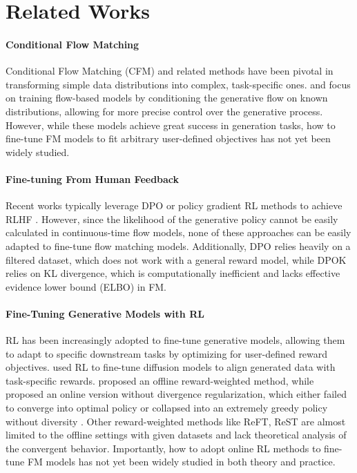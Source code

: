 \section{Related Works}
\paragraph{Conditional Flow Matching} Conditional Flow Matching (CFM) \citep{fmgm,otcfm} and related methods have been pivotal in transforming simple data distributions into complex, task-specific ones. \cite{fmgm} and \cite{otcfm} focus on training flow-based models by conditioning the generative flow on known distributions, allowing for more precise control over the generative process. However, while these models achieve great success in generation tasks, how to fine-tune FM models to fit arbitrary user-defined objectives has not yet been widely studied.



\paragraph{Fine-tuning From Human Feedback} Recent works typically leverage DPO \citep{dpo} or policy gradient RL methods \citep{ddpo,dpok} to achieve RLHF \citep{instructed_rlhf}. However, since the likelihood of the generative policy cannot be easily calculated in continuous-time flow models, none of these approaches can be easily adapted to fine-tune flow matching models. Additionally, DPO \citep{dpo} relies heavily on a filtered dataset, which does not work with a general reward model, while DPOK \citep{dpok} relies on KL divergence, which is computationally inefficient and lacks effective evidence lower bound (ELBO) in FM.


\paragraph{Fine-Tuning Generative Models with RL}
RL has been increasingly adopted to fine-tune generative models, allowing them to adapt to specific downstream tasks by optimizing for user-defined reward objectives. \cite{ddpo,dpok,offline} used RL to fine-tune diffusion models to align generated data with task-specific rewards. \cite{offline} proposed an offline reward-weighted method,  while \cite{ddpo} proposed an online version without divergence regularization, which either failed to converge into optimal policy  or collapsed into an extremely greedy policy without diversity \citep{ddpo}. Other reward-weighted methods like ReFT, ReST \citep{ReFT,Rest} are almost  limited to the offline settings with given datasets and lack theoretical analysis of the convergent behavior.  Importantly, how to adopt online RL methods to fine-tune FM models has not yet been widely studied in both theory and practice.